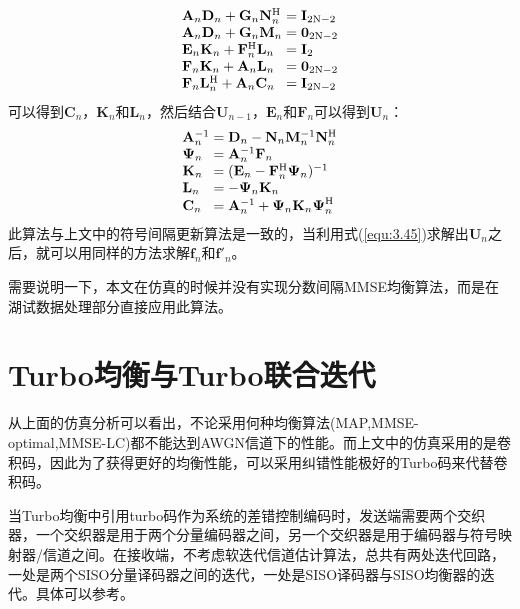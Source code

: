\begin{eqnarray}
    \begin{array}{l@{\;=\;}l}
        \mathbf{A}_n\mathbf{D}_n+\mathbf{G}_n\mathbf{N}_n^{\mathrm{H}}&\mathbf{I}_{2\mathrm{N}-2}\\
        \mathbf{A}_n\mathbf{D}_n+\mathbf{G}_n\mathbf{M}_n&\mathbf{0}_{2\mathrm{N}-2}\\
        \mathbf{E}_n\mathbf{K}_n+\mathbf{F}_n^{\mathrm{H}}\mathbf{L}_n&\mathbf{I}_2\\
        \mathbf{F}_n\mathbf{K}_n+\mathbf{A}_n\mathbf{L}_n&\mathbf{0}_{2\mathrm{N}-2}\\
        \mathbf{F}_n\mathbf{L}_n^{\mathrm{H}}+\mathbf{A}_n\mathbf{C}_n&\mathbf{I}_{2\mathrm{N}-2}
    \end{array}
    \label{equ:3.44}
\end{eqnarray}
可以得到$\mathbf{C}_n\mbox{，}\mathbf{K}_n\mbox{和}\mathbf{L}_n$，然后结合$\mathbf{U}_{n-1}\mbox{，}\mathbf{E}_n\mbox{和}\mathbf{F}_n$可以得到$\mathbf{U}_n$：
\begin{eqnarray}
    \begin{array}{l@{\;=\;}l}
        \mathbf{A}_{n}^{-1}&\mathbf{D}_n-\mathbf{N}_n\mathbf{M}_n^{-1}\mathbf{N}_n^{\mathrm{H}}\\
        \boldsymbol{\Psi}_n&\mathbf{A}_n^{-1}\mathbf{F}_n\\
        \mathbf{K}_n&(\mathbf{E}_n-\mathbf{F}_n^{\mathrm{H}}\boldsymbol{\Psi}_n)^{-1}\\
        \mathbf{L}_n&-\boldsymbol{\Psi}_n\mathbf{K}_n\\
        \mathbf{C}_n&\mathbf{A}_n^{-1}+\boldsymbol{\Psi}_n\mathbf{K}_n\boldsymbol{\Psi}_n^{\mathrm{H}}
    \end{array}
    \label{equ:3.45}
\end{eqnarray}
此算法与上文中的符号间隔更新算法是一致的，当利用式(\ref{equ:3.45})求解出$\mathbf{U}_n$之后，就可以用同样的方法求解$\mathbf{f}_n$和${\mathbf{f}}'_n$。

需要说明一下，本文在仿真的时候并没有实现分数间隔MMSE均衡算法，而是在湖试数据处理部分直接应用此算法。
\section{Turbo均衡与Turbo联合迭代}
从上面的仿真分析可以看出，不论采用何种均衡算法(MAP,MMSE-optimal,MMSE-LC)都不能达到AWGN信道下的性能。而上文中的仿真采用的是卷积码，因此为了获得更好的均衡性能，可以采用纠错性能极好的Turbo码来代替卷积码。

当Turbo均衡中引用turbo码作为系统的差错控制编码时，发送端需要两个交织器，一个交织器是用于两个分量编码器之间，另一个交织器是用于编码器与符号映射器/信道之间。在接收端，不考虑软迭代信道估计算法，总共有两处迭代回路，一处是两个SISO分量译码器之间的迭代，一处是SISO译码器与SISO均衡器的迭代。具体可以参考。


